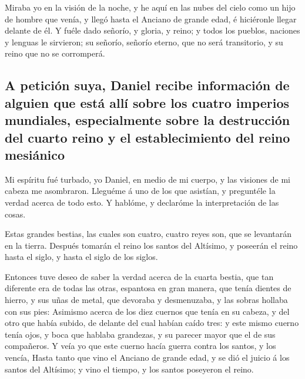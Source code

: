  Miraba yo en la visión de la noche, y he aquí en las
nubes del cielo como un hijo de hombre que venía, y llegó hasta el
Anciano de grande edad, é hiciéronle llegar delante de él.
 Y fuéle dado señorío, y gloria, y reino; y todos los
pueblos, naciones y lenguas le sirvieron; su señorío, señorío eterno,
que no será transitorio, y su reino que no se corromperá.

\hypertarget{a-peticiuxf3n-suya-daniel-recibe-informaciuxf3n-de-alguien-que-estuxe1-alluxed-sobre-los-cuatro-imperios-mundiales-especialmente-sobre-la-destrucciuxf3n-del-cuarto-reino-y-el-establecimiento-del-reino-mesiuxe1nico}{%
\subsection{A petición suya, Daniel recibe información de alguien que
está allí sobre los cuatro imperios mundiales, especialmente sobre la
destrucción del cuarto reino y el establecimiento del reino
mesiánico}\label{a-peticiuxf3n-suya-daniel-recibe-informaciuxf3n-de-alguien-que-estuxe1-alluxed-sobre-los-cuatro-imperios-mundiales-especialmente-sobre-la-destrucciuxf3n-del-cuarto-reino-y-el-establecimiento-del-reino-mesiuxe1nico}}

 Mi espíritu fué turbado, yo Daniel, en medio de mi
cuerpo, y las visiones de mi cabeza me asombraron. 
Lleguéme á uno de los que asistían, y preguntéle la verdad acerca de
todo esto. Y hablóme, y declaróme la interpretación de las cosas.

 Estas grandes bestias, las cuales son cuatro, cuatro
reyes son, que se levantarán en la tierra.  Después
tomarán el reino los santos del Altísimo, y poseerán el reino hasta el
siglo, y hasta el siglo de los siglos.

 Entonces tuve deseo de saber la verdad acerca de la
cuarta bestia, que tan diferente era de todas las otras, espantosa en
gran manera, que tenía dientes de hierro, y sus uñas de metal, que
devoraba y desmenuzaba, y las sobras hollaba con sus pies:
 Asimismo acerca de los diez cuernos que tenía en su
cabeza, y del otro que había subido, de delante del cual habían caído
tres: y este mismo cuerno tenía ojos, y boca que hablaba grandezas, y su
parecer mayor que el de sus compañeros.  Y veía yo que
este cuerno hacía guerra contra los santos, y los vencía,
 Hasta tanto que vino el Anciano de grande edad, y se dió
el juicio á los santos del Altísimo; y vino el tiempo, y los santos
poseyeron el reino.


